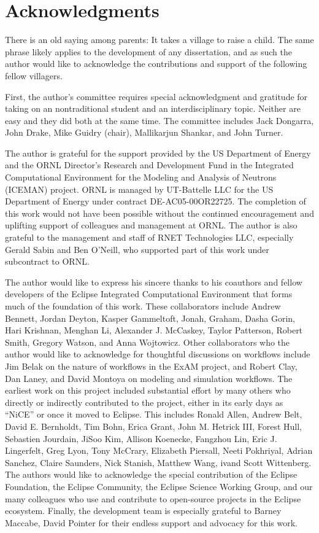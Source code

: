 \chapter*{Acknowledgments}

There is an old saying among parents: It takes a village to raise a child. The
same phrase likely applies to the development of any dissertation, and as such
the author would like to acknowledge the contributions and support of the
following fellow villagers.

First, the author's committee requires special acknowledgment and gratitude
for taking on an nontraditional student and an interdisciplinary topic.
Neither are easy and they did both at the same time. The committee includes Jack
Dongarra, John Drake, Mike Guidry (chair), Mallikarjun Shankar, and John Turner. 

The author is grateful for the support provided by the US Department
of Energy and the ORNL Director’s Research and Development Fund in the
Integrated Computational Environment for the Modeling and Analysis of Neutrons
(ICEMAN) project. ORNL is managed by UT-Battelle LLC for the US Department of
Energy under contract DE-AC05-00OR22725. The completion of this work would not
have been possible without the continued encouragement and uplifting support of
colleagues and management at ORNL. The author is also grateful to the management
and staff of RNET Technologies LLC, especially Gerald Sabin and Ben O'Neill, who
supported part of this work under subcontract to ORNL.

The author would like to express his sincere thanks to his coauthors and
fellow developers of the Eclipse Integrated Computational Environment that
forms much of the foundation of this work. These collaborators include Andrew
Bennett, Jordan Deyton, Kasper Gammeltoft, Jonah, Graham, Dasha Gorin, Hari
Krishnan, Menghan Li, Alexander J. McCaskey, Taylor Patterson, Robert Smith,
Gregory Watson, and Anna Wojtowicz. Other collaborators who the author would
like to acknowledge for thoughtful discussions on workflows include Jim Belak on
the nature of workflows in the ExAM project, and Robert Clay, Dan Laney, and
David Montoya on modeling and simulation workflows. The earliest work on this
project included substantial effort by many others who directly or
indirectly contributed to the project, either in its early days as “NiCE” or
once it moved to Eclipse. This includes Ronald Allen, Andrew Belt, David E.
Bernholdt, Tim Bohn, Erica Grant, John M. Hetrick III, Forest Hull, Sebastien
Jourdain, JiSoo Kim, Allison Koenecke, Fangzhou Lin, Eric J. Lingerfelt, Greg
Lyon, Tony McCrary, Elizabeth Piersall, Neeti Pokhriyal, Adrian Sanchez, Claire
Saunders, Nick Stanish, Matthew Wang, ivand Scott Wittenberg. The authors would
like to acknowledge the special contribution of the Eclipse Foundation, the
Eclipse Community, the Eclipse Science Working Group, and our many colleagues
who use and contribute to open-source projects in the Eclipse ecosystem.
Finally, the development team is especially grateful to Barney Maccabe, David
Pointer for their endless support and advocacy for this work.

